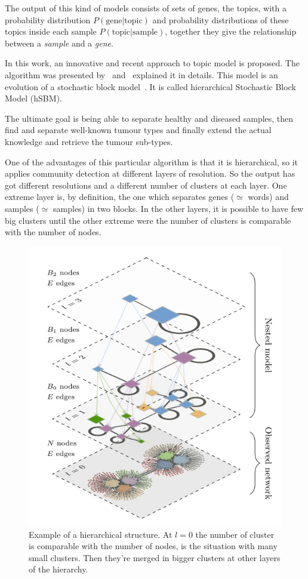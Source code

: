 The output of this kind of models consists of sets of genes, the topics, with a probability distribution $P(\text{gene} | \text{topic})$ and probability distributions of these topics inside each sample $P(\text{topic} | \text{sample})$, together they give the relationship between a \textit{sample} and a \textit{gene}.

In this work, an innovative and recent approach to topic model is proposed. The algorithm was presented by~\cite{gerlach2018network} and~\cite{Peixoto2017} explained it in details. This model is an evolution of a stochastic block model~\cite{Holland1983}. It is called hierarchical Stochastic Block Model (hSBM).

The ultimate goal is being able to separate healthy and diseased samples, then find and separate well-known tumour types and finally extend the actual knowledge and retrieve the tumour sub-types.

One of the advantages of this particular algorithm is that it is hierarchical, so it applies community detection at different layers of resolution. So the output has got different resolutions and a different number of clusters at each layer. One extreme layer is, by definition, the one which separates genes ($\simeq$ words) and samples ($\simeq$ samples) in two blocks. In the other layers, it is possible to have few big clusters until the other extreme were the number of clusters is comparable with the number of nodes.
\begin{figure}[htb!]
  \centering
  \includegraphics[width=0.6\linewidth]{pictures/topic/peixioto_hierarchic.jpg}
  \caption{Example of a hierarchical structure. At $l=0$ the number of cluster is comparable with the number of nodes, is the situation with many small clusters. Then they're merged in bigger clusters at other layers of the hierarchy.}
  \label{fig:topic_peixioto_hierarchic}
\end{figure}

